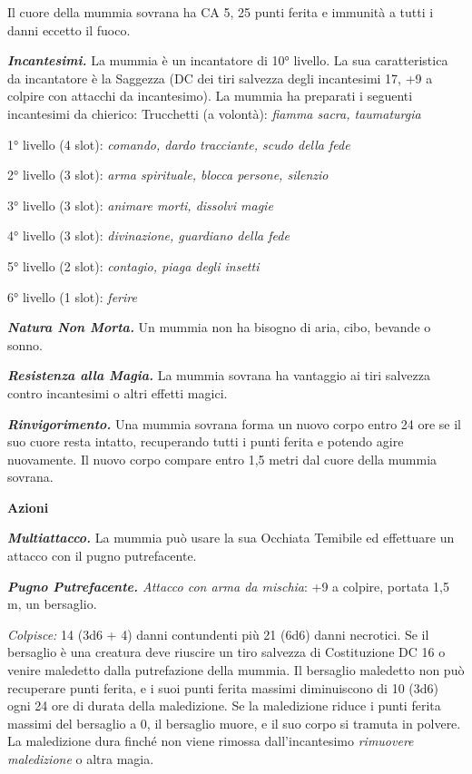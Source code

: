 \begin{multicols}{2}
Il cuore della mummia sovrana ha CA 5, 25 punti ferita e immunità a
tutti i danni eccetto il fuoco.

\emph{\textbf{Incantesimi.}} La mummia è un incantatore di 10° livello.
La sua caratteristica da incantatore è la Saggezza (DC dei tiri salvezza
degli incantesimi 17, +9 a colpire con attacchi da incantesimo). La
mummia ha preparati i seguenti incantesimi da chierico: Trucchetti (a
volontà): \emph{fiamma sacra, taumaturgia}

1° livello (4 slot): \emph{comando, dardo tracciante, scudo della fede}

2° livello (3 slot): \emph{arma spirituale, blocca persone, silenzio}

3° livello (3 slot): \emph{animare morti, dissolvi magie}

4° livello (3 slot): \emph{divinazione, guardiano della fede}

5° livello (2 slot): \emph{contagio, piaga degli insetti}

6° livello (1 slot): \emph{ferire}

\emph{\textbf{Natura Non Morta.}} Un mummia non ha bisogno di aria,
cibo, bevande o sonno.

\emph{\textbf{Resistenza alla Magia.}} La mummia sovrana ha vantaggio ai
tiri salvezza contro incantesimi o altri effetti magici.

\emph{\textbf{Rinvigorimento.}} Una mummia sovrana forma un nuovo corpo
entro 24 ore se il suo cuore resta intatto, recuperando tutti i punti
ferita e potendo agire nuovamente. Il nuovo corpo compare entro 1,5
metri dal cuore della mummia sovrana.

\textbf{Azioni}

\emph{\textbf{Multiattacco.}} La mummia può usare la sua Occhiata
Temibile ed effettuare un attacco con il pugno putrefacente.

\emph{\textbf{Pugno Putrefacente.} Attacco con arma da mischia}: +9 a
colpire, portata 1,5 m, un bersaglio.

\emph{Colpisce:} 14 (3d6 + 4) danni contundenti più 21 (6d6) danni
necrotici. Se il bersaglio è una creatura deve riuscire un tiro salvezza
di Costituzione DC 16 o venire maledetto dalla putrefazione della
mummia. Il bersaglio maledetto non può recuperare punti ferita, e i suoi
punti ferita massimi diminuiscono di 10 (3d6) ogni 24 ore di durata
della maledizione. Se la maledizione riduce i punti ferita massimi del
bersaglio a 0, il bersaglio muore, e il suo corpo si tramuta in polvere.
La maledizione dura finché non viene rimossa dall'incantesimo
\emph{rimuovere maledizione} o altra magia.


\end{multicols}
